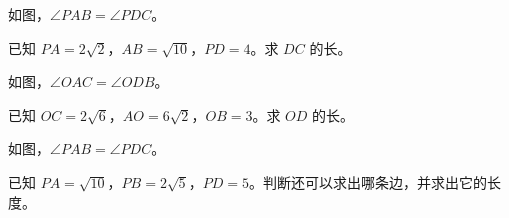 \documentclass{exam-zh}
\begin{document}

\begin{problem}[points=10]
  \noindent
  \begin{minipage}[t]{\dimexpr\linewidth-60mm-6mm\relax}
    \vspace{0pt}
    如图，$\angle PAB=\angle PDC$。

已知 $PA=2\sqrt{2}$，$AB=\sqrt{10}$，$PD=4$。求 $DC$ 的长。
    
  \end{minipage}\hfill
  \begin{diagramcoltikz}{60mm}{}
  }
  \end{diagramcoltikz}
  \par\medskip
  \answerarea[54mm]
\end{problem}



\begin{problem}[points=10]
  \noindent
  \begin{minipage}[t]{\dimexpr\linewidth-60mm-6mm\relax}
    \vspace{0pt}
    如图，$\angle OAC=\angle ODB$。

已知 $OC=2\sqrt{6}$，$AO=6\sqrt{2}$，$OB=3$。求 $OD$ 的长。
    
  \end{minipage}\hfill
  \begin{diagramcoltikz}{60mm}{}
  }
  \end{diagramcoltikz}
  \par\medskip
  \answerarea[54mm]
\end{problem}



\begin{problem}[points=10]
  \noindent
  \begin{minipage}[t]{\dimexpr\linewidth-60mm-6mm\relax}
    \vspace{0pt}
    如图，$\angle PAB=\angle PDC$。

已知 $PA=\sqrt{10}$，$PB=2\sqrt{5}$，$PD=5$。判断还可以求出哪条边，并求出它的长度。
    
  \end{minipage}\hfill
  \begin{diagramcoltikz}{60mm}{}
  }
  \end{diagramcoltikz}
  \par\medskip
  \answerarea[54mm]
\end{problem}
\end{document}
